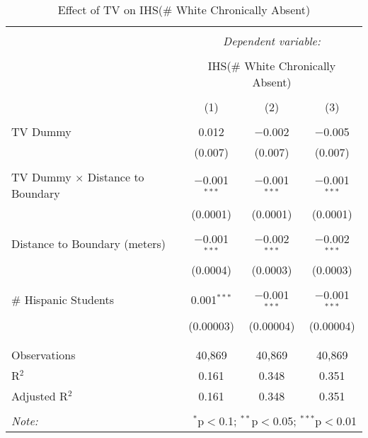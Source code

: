 
\begin{table}[!htbp] \centering 
  \caption{Effect of TV on IHS(\# White Chronically Absent)} 
  \label{} 
\begin{tabular}{@{\extracolsep{-2pt}}lccc} 
\\[-1.8ex]\hline 
\hline \\[-1.8ex] 
 & \multicolumn{3}{c}{\textit{Dependent variable:}} \\ 
\cline{2-4} 
\\[-1.8ex] & \multicolumn{3}{c}{IHS(\# White Chronically Absent)} \\ 
\\[-1.8ex] & (1) & (2) & (3)\\ 
\hline \\[-1.8ex] 
 TV Dummy & 0.012 & $-$0.002 & $-$0.005 \\ 
  & (0.007) & (0.007) & (0.007) \\ 
  & & & \\ 
 TV Dummy $\times$ Distance to Boundary & $-$0.001$^{***}$ & $-$0.001$^{***}$ & $-$0.001$^{***}$ \\ 
  & (0.0001) & (0.0001) & (0.0001) \\ 
  & & & \\ 
 Distance to Boundary (meters) & $-$0.001$^{***}$ & $-$0.002$^{***}$ & $-$0.002$^{***}$ \\ 
  & (0.0004) & (0.0003) & (0.0003) \\ 
  & & & \\ 
 \# Hispanic Students & 0.001$^{***}$ & $-$0.001$^{***}$ & $-$0.001$^{***}$ \\ 
  & (0.00003) & (0.00004) & (0.00004) \\ 
  & & & \\ 
\hline \\[-1.8ex] 
Observations & 40,869 & 40,869 & 40,869 \\ 
R$^{2}$ & 0.161 & 0.348 & 0.351 \\ 
Adjusted R$^{2}$ & 0.161 & 0.348 & 0.351 \\ 
\hline 
\hline \\[-1.8ex] 
\textit{Note:}  & \multicolumn{3}{r}{$^{*}$p$<$0.1; $^{**}$p$<$0.05; $^{***}$p$<$0.01} \\ 
\end{tabular} 
\end{table} 
